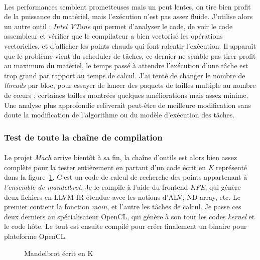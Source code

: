 \paragraph{}
Les performances semblent prometteuses mais un peut lentes, on tire bien profit
de la puissance du matériel, mais l'exécution n'est pas assez fluide. J'utilise
alors un autre outil : \emph{Intel VTune} qui permet d'analyser le code, de voir
le code assembleur et vérifier que le compilateur a bien vectorisé les
opérations vectorielles, et d'afficher les points chauds qui font ralentir
l'exécution. Il apparaît que le problème vient du scheduler de tâches, ce
dernier ne semble pas tirer profit au maximum du matériel, le temps passé à
attendre l'exécution d'une tâche est trop grand par rapport au temps de calcul.
J'ai tenté de changer le nombre de \emph{threads} par bloc, pour essayer de
lancer des paquets de tailles multiple au nombre de c\oe{}urs ; certaines
tailles montrées quelques améliorations mais assez minime. Une analyse plus
approfondie relèverait peut-être de meilleure modification sans doute la
modification de l'algorithme ou du modèle d'exécution des tâches.

\subsubsection{Test de toute la chaîne de compilation}
\paragraph{}
Le projet \emph{Mach} arrive bientôt à sa fin, la chaîne d'outils est alors bien
assez complète pour la tester entièrement en partant d'un code écrit en \emph{K}
représenté dans la figure~\ref{mandel_k}. C'est un code de calcul de recherche
des points appartenant à \emph{l'ensemble de mandelbrot}. Je le compile à l'aide
du frontend \emph{KFE}, qui génère deux fichiers en LLVM IR étendue avec les
notions d'ALV, ND array, etc. Le premier contient la fonction \emph{main}, et
l'autre les tâches de calcul. Je passe ces deux derniers au spécialisateur
OpenCL, qui génère à son tour les codes \emph{kernel} et le code hôte. Le tout
est ensuite compilé pour créer finalement un binaire pour plateforme OpenCL.

\begin{figure}[hb!]
   
   \caption{Mandelbrot écrit en K}
   \label{mandel_k}
\end{figure}
